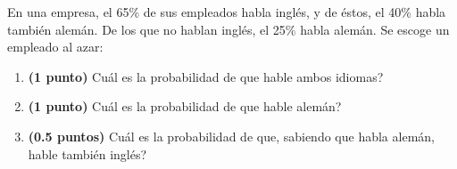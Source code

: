 
En una empresa, el 65\% de sus empleados habla inglés, y de éstos, el 40\% habla también alemán. De los que no hablan inglés, el 25\% habla alemán. Se escoge un empleado al azar:
\begin{enumerate}[label=\alph*)]
\item \textbf{(1 punto)} \textquestiondown{}Cuál es la probabilidad de que hable ambos idiomas?
\item \textbf{(1 punto)} \textquestiondown{}Cuál es la probabilidad de que hable alemán?
\item \textbf{(0.5 puntos)} \textquestiondown{}Cuál es la probabilidad de que, sabiendo que habla alemán, hable también inglés?
\end{enumerate}
